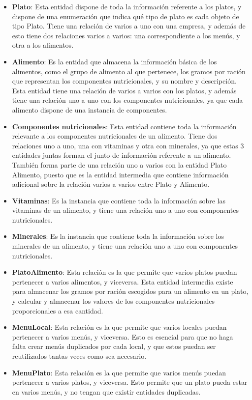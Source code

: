 \begin{itemize}
	\item \textbf{Plato}: Esta entidad dispone de toda la información referente a los platos, y dispone de una enumeración que indica qué tipo de plato es cada objeto de tipo Plato. Tiene una relación de varios a uno con una empresa, y además de esto tiene dos relaciones varios a varios: una correspondiente a los menús, y otra a los alimentos.
	\item \textbf{Alimento}: Es la entidad que almacena la información básica de los alimentos, como el grupo de alimento al que pertenece, los gramos por ración que representan los componentes nutricionales, y su nombre y descripción. Esta entidad tiene una relación de varios a varios con los platos, y además tiene una relación uno a uno con los componentes nutricionales, ya que cada alimento dispone de una instancia de componentes.
	\item \textbf{Componentes nutricionales}: Esta entidad contiene toda la información relevante a los componentes nutricionales de un alimento. Tiene dos relaciones uno a uno, una con vitaminas y otra con minerales, ya que estas 3 entidades juntas forman el junto de información referente a un alimento. También forma parte de una relación uno a varios con la entidad Plato \textunderscore Alimento, puesto que es la entidad intermedia que contiene información adicional sobre la relación varios a varios entre Plato y Alimento.
	\item \textbf{Vitaminas}: Es la instancia que contiene toda la información sobre las vitaminas de un alimento, y tiene una relación uno a uno con componentes nutricionales.
	\item \textbf{Minerales}: Es la instancia que contiene toda la información sobre los minerales de un alimento, y tiene una relación uno a uno con componentes nutricionales.
	\item \textbf{Plato\textunderscore Alimento}: Esta relación es la que permite que varios platos puedan pertenecer a varios alimentos, y viceversa. Esta entidad intermedia existe para almacenar los gramos por ración escogidos para un alimento en un plato, y calcular y almacenar los valores de los componentes nutricionales proporcionales a esa cantidad.
	\item \textbf{Menu\textunderscore Local}: Esta relación es la que permite que varios locales puedan pertenecer a varios menús, y viceversa. Esto es esencial para que no haga falta crear menús duplicados por cada local, y que estos puedan ser reutilizados tantas veces como sea necesario.
	\item \textbf{Menu\textunderscore Plato}: Esta relación es la que permite que varios menús puedan pertenecer a varios platos, y viceversa. Esto permite que un plato pueda estar en varios menús, y no tengan que existir entidades duplicadas.
\end{itemize}



